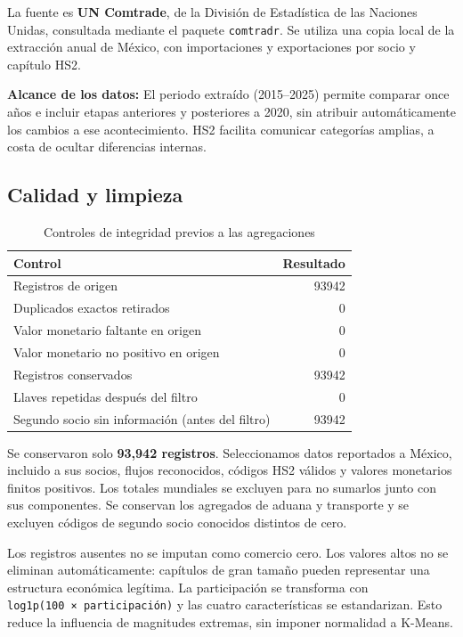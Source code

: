 \documentclass[
  spanish,
  10pt,
]{article}
\begin{document}
La fuente es \textbf{UN Comtrade}, de la División de Estadística de las
Naciones Unidas, consultada mediante el paquete \texttt{comtradr}. Se
utiliza una copia local de la extracción anual de México, con
importaciones y exportaciones por socio y capítulo HS2.

\textbf{Alcance de los datos: } El periodo extraído (2015--2025) permite
comparar once años e incluir etapas anteriores y posteriores a 2020, sin
atribuir automáticamente los cambios a ese acontecimiento. HS2 facilita
comunicar categorías amplias, a costa de ocultar diferencias internas.

\subsection{Calidad y limpieza}\label{calidad-y-limpieza}

\begin{table}

\caption{\label{tab:tabla-calidad}Controles de integridad previos a las agregaciones}
\centering
\begin{tabular}[t]{lr}
\toprule
Control & Resultado\\
\midrule
Registros de origen & 93942\\
Duplicados exactos retirados & 0\\
Valor monetario faltante en origen & 0\\
Valor monetario no positivo en origen & 0\\
Registros conservados & 93942\\
\addlinespace
Llaves repetidas después del filtro & 0\\
Segundo socio sin información (antes del filtro) & 93942\\
\bottomrule
\end{tabular}
\end{table}

Se conservaron solo \textbf{93,942 registros}. Seleccionamos datos
reportados a México, incluido a sus socios, flujos reconocidos, códigos
HS2 válidos y valores monetarios finitos positivos. Los totales
mundiales se excluyen para no sumarlos junto con sus componentes. Se
conservan los agregados de aduana y transporte y se excluyen códigos de
segundo socio conocidos distintos de cero.

Los registros ausentes no se imputan como comercio cero. Los valores
altos no se eliminan automáticamente: capítulos de gran tamaño pueden
representar una estructura económica legítima. La participación se
transforma con \texttt{log1p(100\ ×\ participación)} y las cuatro
características se estandarizan. Esto reduce la influencia de magnitudes
extremas, sin imponer normalidad a K-Means.
\end{document}
